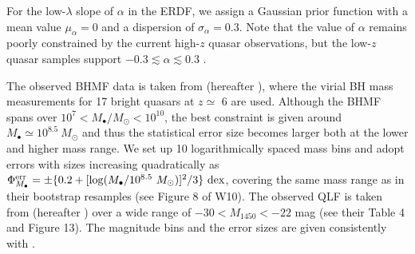 \documentclass[twocolumn, twocolappendix]{aastex63}
\newcommand{\Msun}{M_\odot}
\newcommand{\Mbh}{M_\bullet}
\newcommand{\Muv}{M_{1450}}
\begin{document}
\begin{CJK*}{UTF8}{gbsn}
For the low-$\lambda$ slope of $\alpha$ in the ERDF, we assign a Gaussian prior function with a mean value 
$\mu_{\alpha}=0$ and a dispersion of $\sigma_{\alpha}=0.3$.
Note that the value of $\alpha$ remains poorly constrained by the current high-$z$ quasar observations,
but the low-$z$ quasar samples support $-0.3 \lesssim \alpha \lesssim 0.3$ \citep[e.g., see Figure 21 in][]{2015MNRAS.447.2085S}.


%
The observed BHMF data is taken from \citet{2010AJ....140..546W} (hereafter ), where 
the virial BH mass measurements for 17 bright quasars at $z\simeq $ 6 are used.
Although the BHMF spans over $10^7 < \Mbh/\Msun <10^{10}$, the best constraint is given around 
$\Mbh \simeq 10^{8.5}~\Msun$
and thus the statistical error size becomes larger both at the lower and higher mass range.
We set up 10 logarithmically spaced mass bins and adopt errors with sizes increasing quadratically as 
$\Phi_{\Mbh}^{\rm err} = \pm \{0.2 +   [\log (\Mbh/10^{8.5}~\Msun)]^2/3 \}~{\rm dex}$,
covering the same mass range as in their bootstrap resamples (see Figure 8 of W10). 
The observed QLF is taken from \citet{2018ApJ...869..150M} (hereafter ) 
over a wide range of $-30 < \Muv <-22$ mag (see their Table 4 and Figure 13). 
The magnitude bins and the error sizes are given consistently with .

  


\end{CJK*}
\end{document}
